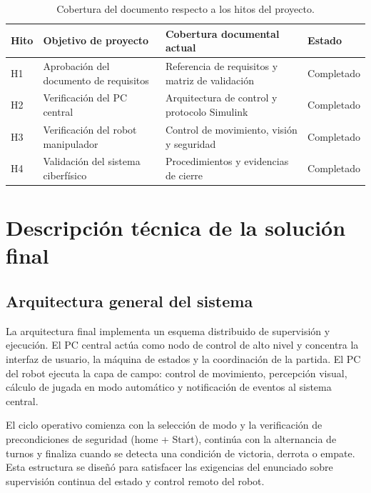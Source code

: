 \documentclass[12pt,a4paper]{article}
\begin{document}
\begin{table}[H]
\centering
\footnotesize
\begin{tabular}{P{0.18\textwidth} P{0.26\textwidth} P{0.26\textwidth} P{0.20\textwidth}}
\toprule
\textbf{Hito} & \textbf{Objetivo de proyecto} & \textbf{Cobertura documental actual} & \textbf{Estado} \\
\midrule
H1 & Aprobación del documento de requisitos & Referencia de requisitos y matriz de validación & Completado \\
H2 & Verificación del PC central & Arquitectura de control y protocolo Simulink & Completado \\
H3 & Verificación del robot manipulador & Control de movimiento, visión y seguridad & Completado \\
H4 & Validación del sistema ciberfísico & Procedimientos y evidencias de cierre & Completado \\
\bottomrule
\end{tabular}
\caption{Cobertura del documento respecto a los hitos del proyecto.}
\end{table}

\section{Descripción técnica de la solución final}

\subsection{Arquitectura general del sistema}
La arquitectura final implementa un esquema distribuido de supervisión y ejecución. El PC central actúa como nodo de control de alto nivel y concentra la interfaz de usuario, la máquina de estados y la coordinación de la partida. El PC del robot ejecuta la capa de campo: control de movimiento, percepción visual, cálculo de jugada en modo automático y notificación de eventos al sistema central.
\par
El ciclo operativo comienza con la selección de modo y la verificación de precondiciones de seguridad (home + Start), continúa con la alternancia de turnos y finaliza cuando se detecta una condición de victoria, derrota o empate. Esta estructura se diseñó para satisfacer las exigencias del enunciado sobre supervisión continua del estado y control remoto del robot.
\end{document}
